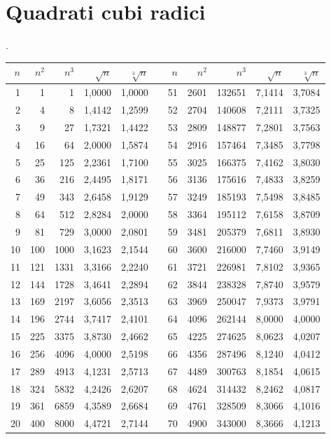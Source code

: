 
\section{Quadrati cubi radici}
\label{sec:Tabellaquadraticubiradici}
. 
\begin{longtable}{rrrrrrrrrrr} 
	\toprule
	\bfseries $n$ &  $n^2$ & $n^3$&$\sqrt{n}$&$\sqrt[3]{n}$& &$n$ &  $n^2$ & $n^3$&$\sqrt{n}$&$\sqrt[3]{n}$  \\
	\midrule \endhead
	\bottomrule \endfoot\index{Tabella!quadrati}\index{Tabella!cubi}\index{Tabella!radici}
1&1&1&1,0000&1,0000&&51&2601&132651&7,1414&3,7084\\
2&4&8&1,4142&1,2599&&52&2704&140608&7,2111&3,7325\\
3&9&27&1,7321&1,4422&&53&2809&148877&7,2801&3,7563\\
4&16&64&2,0000&1,5874&&54&2916&157464&7,3485&3,7798\\
5&25&125&2,2361&1,7100&&55&3025&166375&7,4162&3,8030\\
6&36&216&2,4495&1,8171&&56&3136&175616&7,4833&3,8259\\
7&49&343&2,6458&1,9129&&57&3249&185193&7,5498&3,8485\\
8&64&512&2,8284&2,0000&&58&3364&195112&7,6158&3,8709\\
9&81&729&3,0000&2,0801&&59&3481&205379&7,6811&3,8930\\
10&100&1000&3,1623&2,1544&&60&3600&216000&7,7460&3,9149\\
11&121&1331&3,3166&2,2240&&61&3721&226981&7,8102&3,9365\\
12&144&1728&3,4641&2,2894&&62&3844&238328&7,8740&3,9579\\
13&169&2197&3,6056&2,3513&&63&3969&250047&7,9373&3,9791\\
14&196&2744&3,7417&2,4101&&64&4096&262144&8,0000&4,0000\\
15&225&3375&3,8730&2,4662&&65&4225&274625&8,0623&4,0207\\
16&256&4096&4,0000&2,5198&&66&4356&287496&8,1240&4,0412\\
17&289&4913&4,1231&2,5713&&67&4489&300763&8,1854&4,0615\\
18&324&5832&4,2426&2,6207&&68&4624&314432&8,2462&4,0817\\
19&361&6859&4,3589&2,6684&&69&4761&328509&8,3066&4,1016\\
20&400&8000&4,4721&2,7144&&70&4900&343000&8,3666&4,1213\\

\end{longtable}
